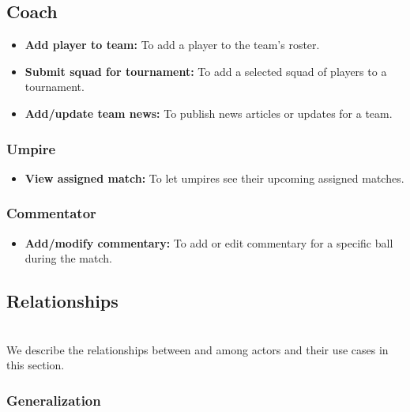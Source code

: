 \subsection{Coach}\label{GCn3WMaZtgtA2Xqd_RxkR}

\begin{itemize}
\item
\protect{}\label{Il6rkWgBLW6KzNVHJaXnt}
\textbf{Add player to team:} To add a player to the team's roster.
\item
\protect{}\label{7sp2MGXHBujUdtnr4QNtR}
\textbf{Submit squad for tournament:} To add a selected squad of players to a tournament.
\item
\protect{}\label{C0p3qAEEOHbmFsmVEL4Pa}
\textbf{Add/update team news:} To publish news articles or updates for a team.
\end{itemize}

\subsubsection{Umpire}\label{JOC16-5I0GeV9BwYmQY7b}

\begin{itemize}
\item
\protect{}\label{PfxYB_iGZxOjcFUCqvbAB}
\textbf{View assigned match:} To let umpires see their upcoming assigned matches.
\end{itemize}

\subsubsection{Commentator}\label{CdOuHEWCNZ7_3wtvr8-7X}

\begin{itemize}
\item
\protect{}\label{VJNin-Hc2LfYiLnhXlh9Q}
\textbf{Add/modify commentary:} To add or edit commentary for a specific ball during the match.
\end{itemize}

\subsection{Relationships}\label{8BL5FscWTauKUf5jddA9H}
\\
We describe the relationships between and among actors and their use cases in this section.

\subsubsection{Generalization}\label{PvYmjGpiy7o6fml9rt2qK}

